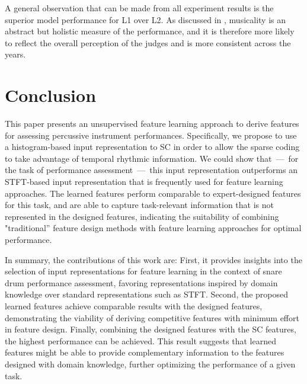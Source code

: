 \documentclass{ws-ijsc}
\begin{document}
A general observation that can be made from all experiment results is the superior model performance for L1 over L2. As discussed in \cite{Wu2016}, musicality is an abstract but holistic measure of the performance, and it is therefore more likely to reflect the overall perception of the judges and is more consistent across the years. %

\section{Conclusion}\label{sec:conclusion}
This paper presents an unsupervised feature learning approach to derive features for assessing percussive instrument performances. Specifically, we propose to use a histogram-based input representation to SC in order to allow the sparse coding to take advantage of temporal rhythmic information. We could show that~---~for the task of performance assessment~---~this input representation outperforms an STFT-based input representation that is frequently used for feature learning approaches. The learned features perform comparable to expert-designed features for this task, and are able to capture task-relevant information that is not represented in the designed features, indicating the suitability of combining "traditional'' feature design methods with feature learning approaches for optimal performance.

In summary, the contributions of this work are: 
First, it provides insights into the selection of input representations for feature learning in the context of snare drum performance assessment, favoring representations inspired by domain knowledge over standard representations such as STFT. 
Second, the proposed learned features achieve comparable results with the designed features, demonstrating the viability of deriving competitive features with minimum effort in feature design. 
Finally, combining the designed features with the SC features, the highest performance can be achieved. This result suggests that learned features might be able to provide complementary information to the features designed with domain knowledge, further optimizing the performance of a given task. 
\end{document}
